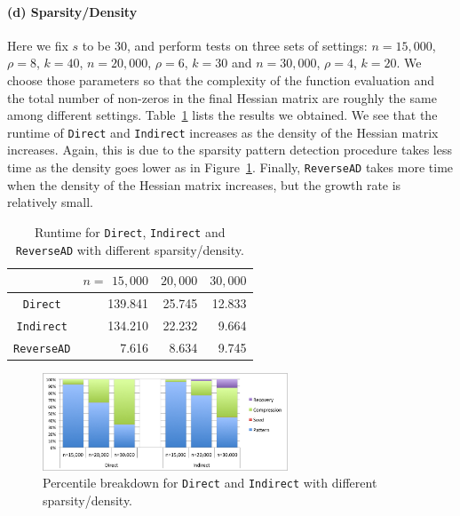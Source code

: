 \documentclass[final,leqno,onefignum,onetabnum]{siamart}
\begin{document}
\paragraph{(d) Sparsity/Density} 
Here we fix $s$ to be  $30$, and perform tests on three sets of settings: $n=15,000$, $\rho = 8$, $k=40$, $n=20,000$, $\rho=6$, $k=30$ and $n=30,000$, $\rho=4$, $k=20$. 
We choose those parameters so that the complexity of the function evaluation and the total number of non-zeros in the final Hessian matrix are roughly the same among different settings. 
Table~\ref{tab:sparsity} lists the results we obtained.
We see that the runtime of {\tt Direct} and {\tt Indirect} increases as the density of the Hessian matrix increases. 
Again, this is due to the sparsity pattern detection procedure takes less time as the density goes lower as in Figure~\ref{fig:sparsity-percentile}.
Finally, {\tt ReverseAD} takes more time when the density of the Hessian matrix increases, but the growth rate is relatively small.
\begin{table}[htbp]
\begin{center}
\begin{tabular}{ | c | r | r | r |}
\hline
& $n=$ $15,000$ & $20,000$ & $30,000$\\
\hline
{\tt Direct} & 139.841 & 25.745 & 12.833\\
{\tt Indirect} & 134.210 & 22.232 & 9.664 \\
{\tt ReverseAD} & 7.616 & 8.634 & 9.745\\
\hline 
\end{tabular}
\caption{Runtime for {\tt Direct}, {\tt Indirect} and {\tt ReverseAD} with different sparsity/density.}
\label{tab:sparsity}
\end{center}
\end{table}

\begin{figure}[htbp]
        \centering
        \includegraphics[width=0.65\textwidth]{figures/pd}
        \caption{Percentile breakdown for {\tt Direct} and {\tt Indirect} with different sparsity/density.}
        \label{fig:sparsity-percentile}
\end{figure}
\end{document}
